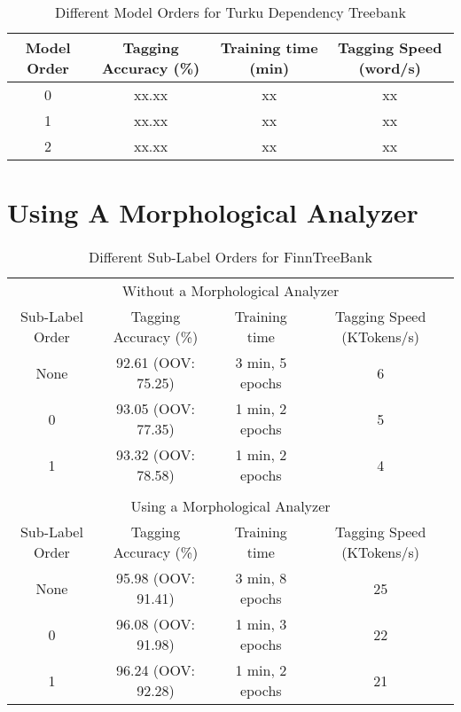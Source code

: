 \begin{table}[htb!]
\begin{center}
\begin{tabular}{cccc}
Model Order & Tagging Accuracy (\%) & Training time (min) & Tagging Speed (word/s)\\
\hline
0        & xx.xx            & xx            & xx            \\
1        & xx.xx            & xx            & xx            \\
2        & xx.xx            & xx            & xx            \\
\hline
\end{tabular}
\caption{Different Model Orders for Turku Dependency Treebank}
\end{center}
\end{table}

\section{Using A Morphological Analyzer}

\begin{table}[htb!]
\begin{center}
\begin{tabular}{cccc}
\multicolumn{4}{c}{Without a Morphological Analyzer}\\
Sub-Label Order & Tagging Accuracy (\%) & Training time    & Tagging Speed (KTokens/s)\\
\hline
None            & 92.61 (OOV: 75.25)    & 3 min, 5 epochs  & 6                       \\
0               & 93.05 (OOV: 77.35)    & 1 min, 2 epochs  & 5                       \\
1               & 93.32 (OOV: 78.58)    & 1 min, 2 epochs  & 4                       \\
\hline
                &                       &                  &                          \\
\multicolumn{4}{c}{Using a Morphological Analyzer}\\
Sub-Label Order & Tagging Accuracy (\%) & Training time    & Tagging Speed (KTokens/s)\\
\hline
None     & 95.98 (OOV: 91.41)           & 3 min, 8 epochs  & 25                       \\
0        & 96.08 (OOV: 91.98)           & 1 min, 3 epochs  & 22                       \\
1        & 96.24 (OOV: 92.28)           & 1 min, 2 epochs  & 21                       \\
\end{tabular}
\caption{Different Sub-Label Orders for FinnTreeBank}
\end{center}
\end{table}


